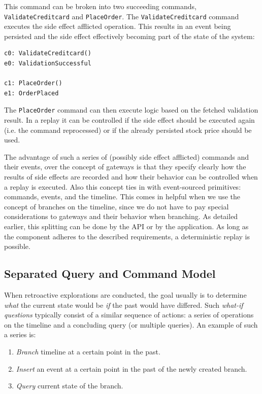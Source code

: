 This command can be broken into two succeeding commands, 
\texttt{ValidateCreditcard} and \texttt{PlaceOrder}.
The \texttt{ValidateCreditcard} command executes the side effect
afflicted operation. This results in an event being persisted and the
side effect effectively becoming part of the state of the system: 

\begin{lstlisting}[style=styled]
c0: ValidateCreditcard()
e0: ValidationSuccessful

c1: PlaceOrder()
e1: OrderPlaced
\end{lstlisting}

The \texttt{PlaceOrder} command can then execute logic based on the fetched 
validation result. In a replay it can be controlled if the side effect should 
be executed again (i.e. the command reprocessed) or if the already persisted 
stock price should be used.

The advantage of such a series of (possibly side effect afflicted) commands
and their events, over the concept of gateways is that they specify clearly 
how the results of side effects are recorded and how their behavior can be 
controlled when a replay is executed. 
Also this concept ties in with event-sourced primitives: commands, events, 
and the timeline. This comes in helpful when we use the concept of branches 
on the timeline, since we do not have to pay special considerations to gateways 
and their behavior when branching. As detailed earlier, this splitting can be 
done by the API or by the application. 
As long as the component adheres to the described requirements, a deterministic 
replay is possible.

\subsection{Separated Query and Command Model}
\label{sec:issues-ec}
When retroactive explorations are conducted, the goal usually is to determine
\emph{what} the current state would be \emph{if} the past would have differed.
Such \emph{what-if questions} typically consist of a similar sequence of actions:
a series of operations on the timeline and a concluding query (or multiple queries). 
An example of such a series is:

\begin{enumerate}
	\item \emph{Branch} timeline at a certain point in the past.
	\item \emph{Insert} an event at a certain point in the past of the newly created branch.
	\item \emph{Query} current state of the branch.
\end{enumerate}

